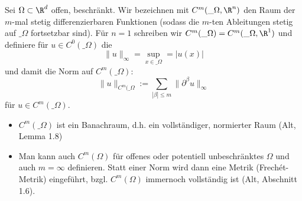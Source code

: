 \begin{df} \label{1.3}
	Sei $\Omega \subset \R^d$ offen, beschränkt.
	Wir bezeichnen mit $C^m(\_\Omega, \R^n)$ den Raum der $m$-mal stetig differenzierbaren Funktionen (sodass die $m$-ten Ableitungen stetig auf $\_\Omega$ fortsetzbar sind).
	Für $n = 1$ schreiben wir $C^m(\_\Omega) = C^m(\_\Omega, \R^1)$ und definiere für $u \in C^0(\_\Omega)$ die 
	\[
		\|u\|_\infty = \sup_{x\in \_\Omega} = |u(x)|
	\]
	und damit die Norm auf $C^m(\_\Omega)$:
	\[
		\|u\|_{C^m(\_\Omega} := \sum_{|\beta| \le m} \|\partial^\beta u\|_\infty
	\]
	für $u \in C^m(\_\Omega)$.
	\begin{note}
		\begin{itemize}
			\item
				$C^m(\_\Omega)$ ist ein Banachraum, d.h. ein vollständiger, normierter Raum (Alt, Lemma 1.8)
			\item
				Man kann auch $C^m(\Omega)$ für offenes oder potentiell unbeschränktes $\Omega$ und auch $m = \infty$ definieren.
				Statt einer Norm wird dann eine Metrik (Frechét-Metrik) eingeführt, bzgl. $C^m(\Omega)$ immernoch vollständig ist (Alt, Abschnitt 1.6).
		\end{itemize}		
	\end{note}
\end{df}

